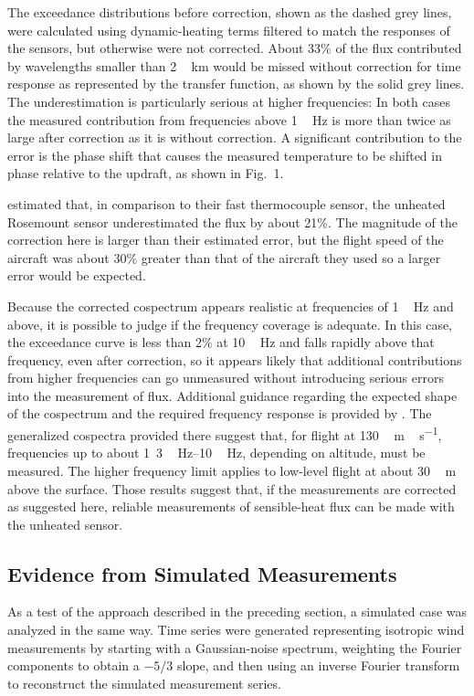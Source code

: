 \documentclass[amt, manuscript]{copernicus}
\begin{document}
The exceedance distributions before correction, shown as the dashed grey
lines, were calculated using dynamic-heating terms filtered to match the
responses of the sensors, but otherwise were not corrected. About 33\%
of the flux contributed by wavelengths smaller than \unit{2\,km} would
be missed without correction for time response as represented by the
transfer function, as shown by the solid grey lines. The underestimation
is particularly serious at higher frequencies: In both cases the
measured contribution from frequencies above \unit{1\,Hz} is more than
twice as large after correction as it is without correction. A
significant contribution to the error is the phase shift that causes the
measured temperature to be shifted in phase relative to the updraft, as
shown in Fig.~1.

\citet{LawsonRodi1992} estimated that, in comparison to their fast
thermocouple sensor, the unheated Rosemount sensor underestimated the
flux by about 21\%. The magnitude of the correction here is larger than
their estimated error, but the flight speed of the aircraft was about
30\% greater than that of the aircraft they used so a larger error would
be expected.

Because the corrected cospectrum appears realistic at frequencies of
\unit{1\,Hz} and above, it is possible to judge if the frequency
coverage is adequate. In this case, the exceedance curve is less than
2\% at \unit{10\,Hz} and falls rapidly above that frequency, even after
correction, so it appears likely that additional contributions from
higher frequencies can go unmeasured without introducing serious errors
into the measurement of flux. Additional guidance regarding the expected
shape of the cospectrum and the required frequency response is provided
by \citet{lenschow95micro}. The generalized cospectra provided there
suggest that, for flight at \unit{130\,m\,s^{-1}}, frequencies up to
about \unit{1.3\,Hz}--\unit{10\,Hz}, depending on altitude, must be
measured. The higher frequency limit applies to low-level flight at
about \unit{30\,m} above the surface. Those results suggest that, if the
measurements are corrected as suggested here, reliable measurements of
sensible-heat flux can be made with the unheated sensor.

\subsection{Evidence from Simulated Measurements}

As a test of the approach described in the preceding section, a
simulated case was analyzed in the same way. Time series were generated
representing isotropic wind measurements by starting with a
Gaussian-noise spectrum, weighting the Fourier components to obtain a
\(-5/3\) slope, and then using an inverse Fourier transform to
reconstruct the simulated measurement series.
\end{document}
